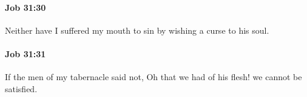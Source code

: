 		\paragraph{Job 31:30} %
			\label{JOB-31-30}

			Neither have I suffered my mouth to sin by wishing a curse to his soul.


		\paragraph{Job 31:31} %
			\label{JOB-31-31}

			If the men of my tabernacle said not, Oh that we had of his flesh! we cannot be satisfied.


